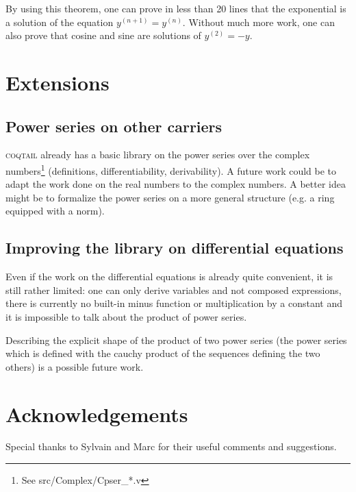 \documentclass[submission,copyright]{eptcs}
\newcommand{\coqtail}{\textsc{coqtail}}
\begin{document}
By using this theorem, one can prove in less than 20 lines that the
exponential is a solution of the equation $y^{(n+1)} = y^{(n)}$. Without
much more work, one can also prove that cosine and sine are solutions
of $y^{(2)} = - y$.

\section{Extensions}

\subsection{Power series on other carriers}

\coqtail{} already has a basic library on the power series over the complex
numbers\footnote{See src/Complex/Cpser\_*.v} (definitions, differentiability,
derivability). A future work could be to adapt the work done on the real
numbers to the complex numbers. A better idea might be to formalize the
power series on a more general structure (e.g. a ring equipped with a norm).

\subsection{Improving the library on differential equations}

Even if the work on the differential equations is already quite
convenient, it is still rather limited: one can only derive variables
and not composed expressions, there is currently no built-in minus
function or multiplication by a constant and it is impossible to talk
about the product of power series.

Describing the explicit shape of the product of two power series (the
power series which is defined with the cauchy product of the sequences
defining the two others) is a possible future work.

\nocite{*}



\section{Acknowledgements}

Special thanks to Sylvain and Marc for their useful comments and
suggestions.
\end{document}
